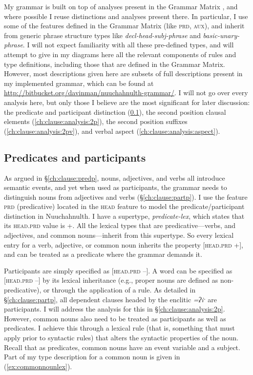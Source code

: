 My grammar is built on top of analyses present in the Grammar Matrix \citep{bender2002}, and where possible I reuse distinctions and analyses present there. In particular, I use some of the features defined in the Grammar Matrix (like \textsc{prd}, \textsc{aux}), and inherit from generic phrase structure types like \textit{decl-head-subj-phrase} and \textit{basic-unary-phrase}. I will not expect familiarity with all these pre-defined types, and will attempt to give in my diagrams here all the relevant components of rules and type definitions, including those that are defined in the Grammar Matrix. However, most descriptions given here are subsets of full descriptions present in my implemented grammar, which can be found at \url{http://bitbucket.org/davinman/nuuchahnulth-grammar/}. I will not go over every analysis here, but only those I believe are the most significant for later discussion: the predicate and participant distinction (\ref{ch:clause:analysis:predpart}), the second position clausal elements (\ref{ch:clause:analysis:2p}), the second position suffixes (\ref{ch:clause:analysis:2pv}), and verbal aspect (\ref{ch:clause:analysis:aspect}).

\subsection{Predicates and participants} \label{ch:clause:analysis:predpart}

As argued in \S\ref{ch:clause:predp}, nouns, adjectives, and verbs all introduce semantic events, and yet when used as participants, the grammar needs to distinguish nouns from adjectives and verbs (\S\ref{ch:clause:partp}). I use the feature \textsc{prd} (predicative) located in the \textsc{head} feature to model the predicate/participant distinction in Nuuchahnulth. I have a supertype, \textit{predicate-lex}, which states that its \textsc{head.prd} value is +. All the lexical types that are predicative---verbs, and adjectives, and common nouns---inherit from this supertype. So every lexical entry for a verb, adjective, or common noun inherits the property [\textsc{head.prd} +], and can be treated as a predicate where the grammar demands it.

Participants are simply specified as [\textsc{head.prd} --]. A word can be specified as [\textsc{head.prd} --] by its lexical inheritance (e.g., proper nouns are defined as non-predicative), or through the application of a rule. As detailed in \S\ref{ch:clause:partp}, all dependent clauses headed by the enclitic \textit{=ʔiˑ} are participants. I will address the analysis for this in \S\ref{ch:clause:analysis:2p}. However, common nouns also need to be treated as participants as well as predicates. I achieve this through a lexical rule (that is, something that must apply prior to syntactic rules) that alters the syntactic properties of the noun. Recall that as predicates, common nouns have an event variable and a subject. Part of my type description for a common noun is given in (\ref{ex:commonnounlex}).

